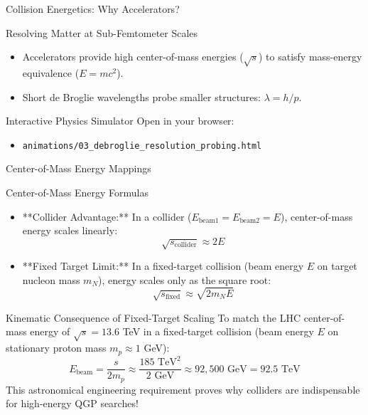 \documentclass[aspectratio=169]{beamer}
\begin{document}
\begin{frame}{Collision Energetics: Why Accelerators?}
    \begin{block}{Resolving Matter at Sub-Femtometer Scales}
        \begin{itemize}
            \item Accelerators provide high center-of-mass energies ($\sqrt{s}$) to satisfy mass-energy equivalence ($E=mc^2$).
            \item Short de Broglie wavelengths probe smaller structures: $\lambda = h/p$.
        \end{itemize}
    \end{block}
    \begin{alertblock}{Interactive Physics Simulator}
        Open in your browser:
        \begin{itemize}
            \item \texttt{animations/03\_debroglie\_resolution\_probing.html} 
        \end{itemize}
    \end{alertblock}
\end{frame}

\begin{frame}{Center-of-Mass Energy Mappings}
    \begin{block}{Center-of-Mass Energy Formulas}
        \begin{itemize}
            \item **Collider Advantage:** In a collider ($E_{\text{beam1}} = E_{\text{beam2}} = E$), center-of-mass energy scales linearly:
            \[ \sqrt{s_{\text{collider}}} \approx 2E \]
            \item **Fixed Target Limit:** In a fixed-target collision (beam energy $E$ on target nucleon mass $m_N$), energy scales only as the square root:
            \[ \sqrt{s_{\text{fixed}}} \approx \sqrt{2 m_N E} \]
        \end{itemize}
    \end{block}
    \begin{block}{Kinematic Consequence of Fixed-Target Scaling}
        To match the LHC center-of-mass energy of $\sqrt{s} = 13.6$ TeV in a fixed-target collision (beam energy $E$ on stationary proton mass $m_p \approx 1$ GeV):
        \[ E_{\text{beam}} = \frac{s}{2m_p} \approx \frac{185 \text{ TeV}^2}{2 \text{ GeV}} \approx 92,500 \text{ GeV} = 92.5 \text{ TeV} \]
        This astronomical engineering requirement proves why colliders are indispensable for high-energy QGP searches!
    \end{block}
\end{frame}
\end{document}
